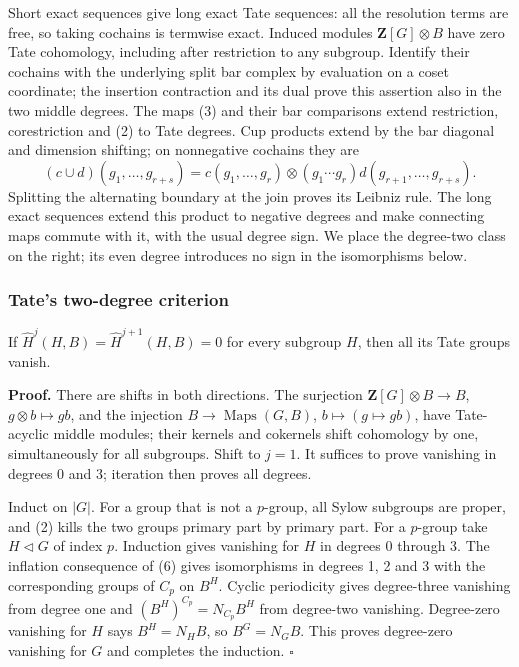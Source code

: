 \documentclass[11pt,a4paper]{article}
\begin{document}
Short exact sequences give long exact Tate sequences: all the resolution
terms are free, so taking cochains is termwise exact. Induced modules
\(\mathbf Z[G]\otimes B\) have zero Tate cohomology, including after
restriction to any subgroup. Identify their cochains with the underlying
split bar complex by evaluation on a coset coordinate; the insertion
contraction and its dual prove this assertion also in the two middle
degrees. The maps (3) and their bar comparisons extend restriction,
corestriction and (2) to Tate degrees. Cup products extend by the bar
diagonal and dimension shifting; on nonnegative cochains they are \[
(c\cup d)(g_1,\ldots,g_{r+s})
=c(g_1,\ldots,g_r)\otimes(g_1\cdots g_r)d(g_{r+1},\ldots,g_{r+s}).
\tag{16}
\] Splitting the alternating boundary at the join proves its Leibniz
rule. The long exact sequences extend this product to negative degrees
and make connecting maps commute with it, with the usual degree sign. We
place the degree-two class on the right; its even degree introduces no
sign in the isomorphisms below.

\subsubsection{Tate's two-degree
criterion}\label{tates-two-degree-criterion}

If \(\widehat H^j(H,B)=\widehat H^{j+1}(H,B)=0\) for every subgroup
\(H\), then all its Tate groups vanish.

\textbf{Proof.} There are shifts in both directions. The surjection
\(\mathbf Z[G]\otimes B\to B\), \(g\otimes b\mapsto gb\), and the
injection \(B\to\operatorname{Maps}(G,B)\), \(b\mapsto(g\mapsto gb)\),
have Tate-acyclic middle modules; their kernels and cokernels shift
cohomology by one, simultaneously for all subgroups. Shift to \(j=1\).
It suffices to prove vanishing in degrees 0 and 3; iteration then proves
all degrees.

Induct on \(|G|\). For a group that is not a \(p\)-group, all Sylow
subgroups are proper, and (2) kills the two groups primary part by
primary part. For a \(p\)-group take \(H\triangleleft G\) of index
\(p\). Induction gives vanishing for \(H\) in degrees 0 through 3. The
inflation consequence of (6) gives isomorphisms in degrees 1, 2 and 3
with the corresponding groups of \(C_p\) on \(B^H\). Cyclic periodicity
gives degree-three vanishing from degree one and
\((B^H)^{C_p}=N_{C_p}B^H\) from degree-two vanishing. Degree-zero
vanishing for \(H\) says \(B^H=N_HB\), so \(B^G=N_GB\). This proves
degree-zero vanishing for \(G\) and completes the induction. \(\square\)
\end{document}
